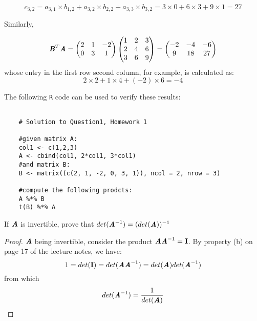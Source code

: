 \documentclass[12pt]{article}
\newcommand{\blditA}{\textbf{\textit{A}}}
\newcommand{\blditB}{\textbf{\textit{B}}}
\newcommand{\bldI}{\textbf{I}}
\newenvironment{question}[2][Question]{\begin{trivlist}
\item[\hskip \labelsep {\bfseries #1}\hskip \labelsep {\bfseries #2.}]}{\end{trivlist}}
\begin{document}
 \begin{equation*}
 c_{3,2} = a_{3,1}\times b_{1,2} +  a_{3,2}\times b_{2,2}  +  a_{3,3}\times b_{3,2} = 3\times 0 + 6\times 3 + 9\times 1 = 27
 \end{equation*}
 
 Similarly,

\begin{equation*} 
\blditB^T \blditA= 
 \begin{pmatrix}
  2 & 1 & -2\\
  0 & 3 & 1\\
\end{pmatrix}
 \begin{pmatrix}
  1 & 2 & 3\\
  2 & 4 & 6\\
  3 & 6 & 9
\end{pmatrix} = 
 \begin{pmatrix}
   -2 & -4 & -6\\
    9  & 18 & 27
\end{pmatrix}
 \end{equation*}
 whose entry in the first row second column, for example, is calculated as:
  \begin{equation*}
 2\times 2 + 1\times 4 + (-2)\times 6 = -4
 \end{equation*}
 
 The following {\tt R} code can be used to verify these results:
 

 \begin{verbatim}
 
	# Solution to Question1, Homework 1

	#given matrix A:
	col1 <- c(1,2,3)
	A <- cbind(col1, 2*col1, 3*col1)
	#and matrix B:
	B <- matrix((c(2, 1, -2, 0, 3, 1)), ncol = 2, nrow = 3)

	#compute the following prodcts:
	A %*% B
	t(B) %*% A

\end{verbatim}

\bigskip
\bigskip

\begin{question}{1.2} 
If $\blditA$ is invertible, prove that $det(\blditA^{-1} ) = (det(\blditA))^{-1}$
\end{question}
\begin{proof}
$\textbf{\textit{A}} $ being invertible, consider the product $\blditA \blditA^{-1} = \bldI$. By property (b) on page 17 of the lecture notes, we have:
\begin{equation*} 
1 = det(\bldI) = 
det(\blditA \blditA^{-1}) = det(\blditA) det(\blditA^{-1})
\end{equation*}
from which
\begin{equation*}
det(\blditA^{-1}) = \frac{1}{det(\blditA)}
\end{equation*}
\end{proof}
\end{document}
